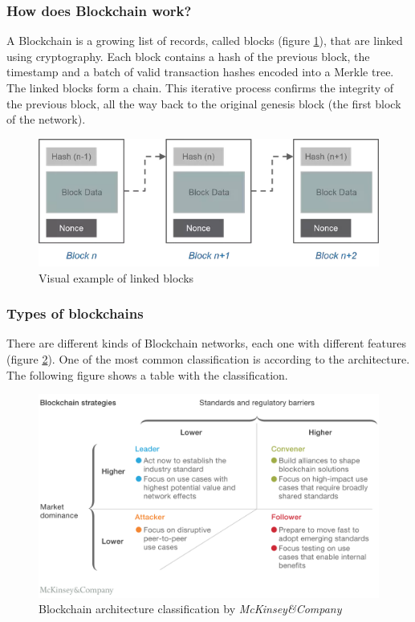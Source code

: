 \documentclass[a4paper, 12pt]{article} %
\begin{document}
        \subsubsection{How does Blockchain work?}
            A Blockchain is a growing list of records, called blocks (figure \ref{fig:linked_blocks}), that are linked using cryptography. Each block contains a hash of the previous block, the timestamp and a batch of valid transaction hashes encoded into a Merkle tree. The linked blocks form a chain. This iterative process confirms the integrity of the previous block, all the way back to the original genesis block (the first block of the network).
            \begin{figure}[h]
                \centering
                \includegraphics[width=1.0\textwidth]{block-example.png}
                \caption{Visual example of linked blocks}
                \label{fig:linked_blocks}
            \end{figure}
            
        \subsubsection{Types of blockchains}
            There are different kinds of Blockchain networks, each one with different features (figure  \ref{fig:blockchain_classification}). One of the most common classification is according to the architecture. The following figure shows a table with the classification.
            \begin{figure}[h]
                \centering
                \includegraphics[width=1.0\textwidth]{Blockchain-types.png}
                \caption{Blockchain architecture classification by \textit{McKinsey\&Company}}
                \label{fig:blockchain_classification}
            \end{figure}
\end{document}
